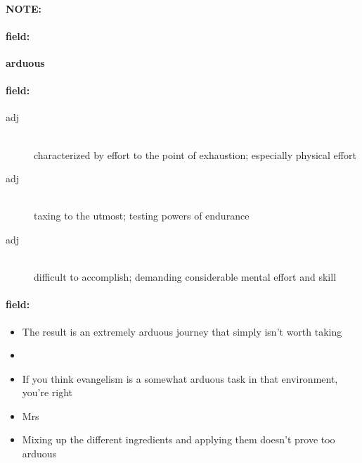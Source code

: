 \documentclass[12pt]{article}
\newenvironment{note}{\paragraph{NOTE:}}{}
\newenvironment{field}{\paragraph{field:}}{}
\begin{document}
\begin{note}
\begin{field}
\textbf{\large arduous}
\end{field}


\begin{field}
\begin{description}
\item[adj] \hfill \\ 
characterized by effort to the point of exhaustion; especially physical effort

\item[adj] \hfill \\ 
taxing to the utmost; testing powers of endurance

\item[adj] \hfill \\ 
difficult to accomplish; demanding considerable mental effort and skill

\end{description}
\end{field}

\begin{field}
\begin{itemize}
\item The result is an extremely arduous journey that simply isn't worth taking
\item 
\item If you think evangelism is a somewhat arduous task in that environment, you're right
\item Mrs
\item Mixing up the different ingredients and applying them doesn't prove too arduous
\end{itemize}
\end{field}
\end{note}
\end{document}
